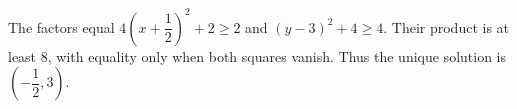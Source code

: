 The factors equal $4(x+\dfrac{1}{2})^2+2\ge2$ and $(y-3)^2+4\ge4$. Their product is at least $8$, with equality only when both squares vanish. Thus the unique solution is $\boxed{(-\dfrac{1}{2},3)}$.
